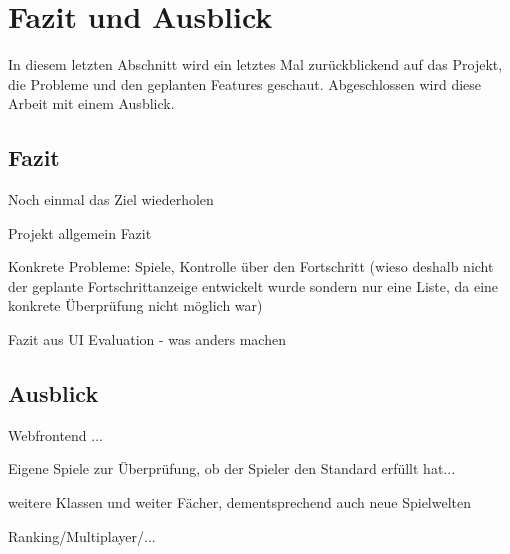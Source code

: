 \chapter{Fazit und Ausblick}
	In diesem letzten Abschnitt wird ein letztes Mal zurückblickend auf das Projekt, die Probleme und den geplanten Features geschaut. Abgeschlossen wird diese Arbeit mit einem Ausblick. 
	
	\section{Fazit}
		Noch einmal das Ziel wiederholen 
	
		Projekt allgemein Fazit
		
		Konkrete Probleme: Spiele, Kontrolle über den Fortschritt (wieso deshalb nicht der geplante Fortschrittanzeige entwickelt wurde sondern nur eine Liste, da eine konkrete Überprüfung nicht möglich war)
		
		Fazit aus UI Evaluation - was anders machen

	\section{Ausblick}
		Webfrontend ...
		
		Eigene Spiele zur Überprüfung, ob der Spieler den Standard erfüllt hat...
		
		weitere Klassen und weiter Fächer, dementsprechend auch neue Spielwelten
		
		Ranking/Multiplayer/...